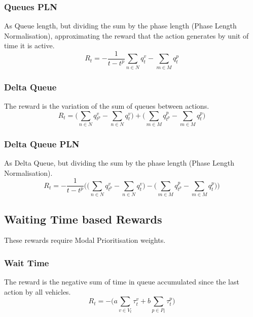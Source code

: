 \documentclass[conference]{IEEEtran}
\begin{document}
\subsubsection{Queues PLN}
As Queue length, but dividing the sum by the phase length (Phase Length Normalisation), approximating the reward that the action generates by unit of time it is active.
\begin{equation}
    R_t = - \frac{1}{t-t^p}  \sum_{n \in N} q^v_{t} -  \sum_{m \in M} q^p_{t}
    \label{queuepln}
\end{equation}

\subsubsection{Delta Queue}
The reward is the variation of the sum of queues between actions.
\begin{equation}
    R_t =  \bigg( \sum_{n \in N} q^v_{t^p} -\sum_{n \in N} q^v_{t} \bigg) +  \bigg( \sum_{m \in M} q^p_{t^p} - \sum_{m \in M} q^p_{t} \bigg)
    \label{deltaqueue}
\end{equation}

\subsubsection{Delta Queue PLN}
As Delta Queue, but dividing the sum by the phase length (Phase Length Normalisation).
\begin{equation}
    R_t = - \frac{1}{t-t^p} \bigg(  \big( \sum_{n \in N} q^v_{t^p} - \sum_{n \in N} q^v_{t} \big) - 
    \big(  \sum_{m \in M} q^p_{t^p}  - \sum_{m \in M} q^p_{t} \big) \bigg)
    \label{deltaqueuepln}
\end{equation}

\subsection{Waiting Time based Rewards}
These rewards require Modal Prioritisation weights.
\subsubsection{Wait Time}
The reward is the negative sum of time in queue accumulated since the last action by all vehicles. 
\begin{equation}
R_t = - \bigg(a \sum_{v \in V_t} \tau^v_{t} + b \sum_{p \in P_t} \tau^p_{t} \bigg)
\label{eq:wait_time}
\end{equation}
\end{document}
